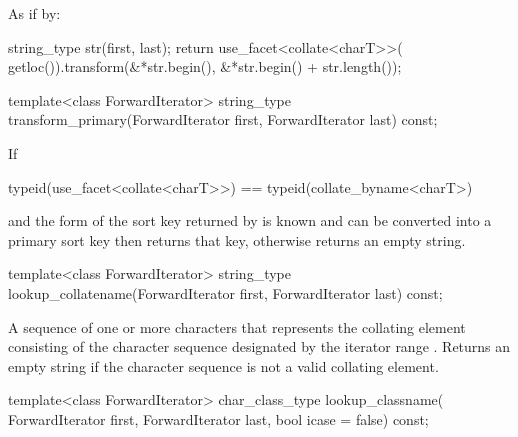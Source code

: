 \begin{itemdescr}
\pnum\effects
As if by:
\begin{codeblock}
string_type str(first, last);
return use_facet<collate<charT>>(
  getloc()).transform(&*str.begin(), &*str.begin() + str.length());
\end{codeblock}
\end{itemdescr}

%
\begin{itemdecl}
template<class ForwardIterator>
  string_type transform_primary(ForwardIterator first, ForwardIterator last) const;
\end{itemdecl}

\begin{itemdescr}
\pnum
\effects
If
\begin{codeblock}
typeid(use_facet<collate<charT>>) == typeid(collate_byname<charT>)
\end{codeblock}
and the form of the sort key returned
by  is known and
can be converted into a primary sort key then returns that key,
otherwise returns an empty string.
\end{itemdescr}

%
\begin{itemdecl}
template<class ForwardIterator>
  string_type lookup_collatename(ForwardIterator first, ForwardIterator last) const;
\end{itemdecl}

\begin{itemdescr}
\pnum\returns A sequence of one or more characters that
represents the collating element consisting of the character
sequence designated by the iterator range .
Returns an empty string if the character sequence is not a
valid collating element.
\end{itemdescr}

%
\begin{itemdecl}
template<class ForwardIterator>
  char_class_type lookup_classname(
    ForwardIterator first, ForwardIterator last, bool icase = false) const;
\end{itemdecl}


